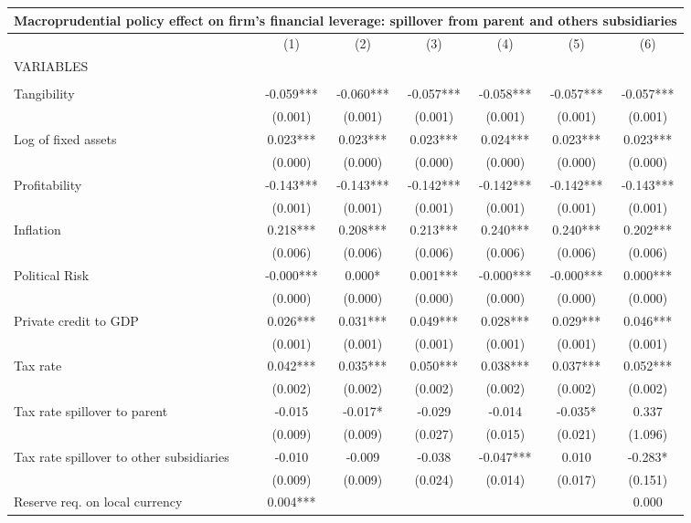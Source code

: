 \begin{tabular}{lcccccc}
\multicolumn{7}{c}{Macroprudential policy effect on firm's financial leverage: spillover from parent and others subsidiaries} \\ \hline
 & (1) & (2) & (3) & (4) & (5) & (6) \\
VARIABLES &  &  &  &  &  &  \\ \hline
 &  &  &  &  &  &  \\
Tangibility & -0.059*** & -0.060*** & -0.057*** & -0.058*** & -0.057*** & -0.057*** \\
 & (0.001) & (0.001) & (0.001) & (0.001) & (0.001) & (0.001) \\
Log of fixed assets & 0.023*** & 0.023*** & 0.023*** & 0.024*** & 0.023*** & 0.023*** \\
 & (0.000) & (0.000) & (0.000) & (0.000) & (0.000) & (0.000) \\
Profitability & -0.143*** & -0.143*** & -0.142*** & -0.142*** & -0.142*** & -0.143*** \\
 & (0.001) & (0.001) & (0.001) & (0.001) & (0.001) & (0.001) \\
Inflation & 0.218*** & 0.208*** & 0.213*** & 0.240*** & 0.240*** & 0.202*** \\
 & (0.006) & (0.006) & (0.006) & (0.006) & (0.006) & (0.006) \\
Political Risk & -0.000*** & 0.000* & 0.001*** & -0.000*** & -0.000*** & 0.000*** \\
 & (0.000) & (0.000) & (0.000) & (0.000) & (0.000) & (0.000) \\
Private credit to GDP & 0.026*** & 0.031*** & 0.049*** & 0.028*** & 0.029*** & 0.046*** \\
 & (0.001) & (0.001) & (0.001) & (0.001) & (0.001) & (0.001) \\
Tax rate & 0.042*** & 0.035*** & 0.050*** & 0.038*** & 0.037*** & 0.052*** \\
 & (0.002) & (0.002) & (0.002) & (0.002) & (0.002) & (0.002) \\
Tax rate spillover to parent & -0.015 & -0.017* & -0.029 & -0.014 & -0.035* & 0.337 \\
 & (0.009) & (0.009) & (0.027) & (0.015) & (0.021) & (1.096) \\
Tax rate spillover to other subsidiaries & -0.010 & -0.009 & -0.038 & -0.047*** & 0.010 & -0.283* \\
 & (0.009) & (0.009) & (0.024) & (0.014) & (0.017) & (0.151) \\
Reserve req. on local currency & 0.004*** &  &  &  &  & 0.000 \\

\end{tabular}
